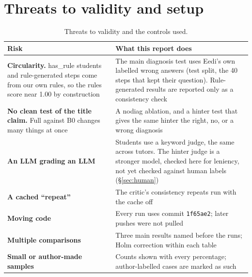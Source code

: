 \documentclass[11pt,a4paper]{article}
\newcommand{\code}[1]{\texttt{#1}}
\newcommand{\grp}[1]{\textsf{#1}}
\newcommand{\cond}[1]{\textsf{#1}}
\begin{document}
\section{Threats to validity and setup}\label{app:setup}
\begin{table}[H]
\centering\small
\begin{tabularx}{\linewidth}{@{}P{4.2cm}Y@{}}
\toprule
Risk & What this report does \\
\midrule
\textbf{Circularity.} \grp{has\_rule} students and rule-generated steps come from our own rules, so the rules score near 1.00 by construction & The main diagnosis test uses Eedi's own labelled wrong answers (test split, the 40 steps that kept their question). Rule-generated results are reported only as a consistency check \\
\textbf{No clean test of the title claim.} Full against B0 changes many things at once & A \cond{nodiag} ablation, and a hinter test that gives the same hinter the right, no, or a wrong diagnosis \\
\textbf{An LLM grading an LLM} & Students use a keyword judge, the same across tutors. The hinter judge is a stronger model, checked here for leniency, not yet checked against human labels (\S\ref{sec:human}) \\
\textbf{A cached ``repeat''} & The critic's consistency repeats run with the cache off \\
\textbf{Moving code} & Every run uses commit \code{1f65ae2}; later pushes were not pulled \\
\textbf{Multiple comparisons} & Three main results named before the runs; Holm correction within each table \\
\textbf{Small or author-made samples} & Counts shown with every percentage; author-labelled cases are marked as such \\
\bottomrule
\end{tabularx}
\caption{Threats to validity and the controls used.}
\end{table}
\end{document}

